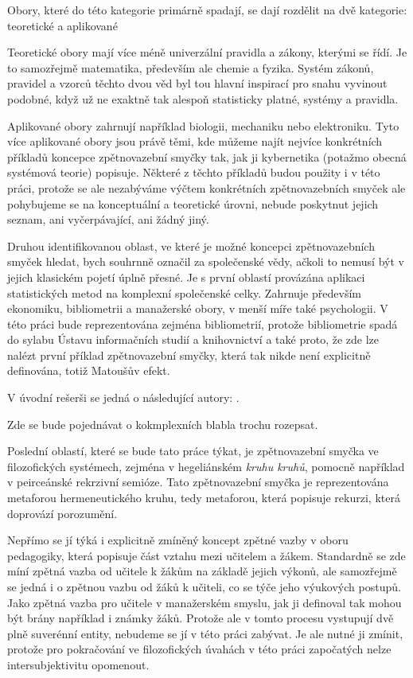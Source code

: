 \documentclass[11pt,a4paper]{article}
\begin{document}
Obory, které do této kategorie primárně spadají, se dají rozdělit na dvě kategorie: teoretické a aplikované

Teoretické obory mají více méně univerzální pravidla a zákony, kterými se řídí. Je to samozřejmě matematika, především ale chemie a fyzika. Systém zákonů, pravidel a vzorců těchto dvou věd byl tou hlavní inspirací pro snahu vyvinout podobné, když už ne exaktně tak alespoň statisticky platné, systémy a pravidla.

Aplikované obory zahrnují například biologii, mechaniku nebo elektroniku. Tyto více aplikované obory jsou právě těmi, kde můžeme najít nejvíce konkrétních příkladů koncepce zpětnovazební smyčky tak, jak ji kybernetika (potažmo obecná systémová teorie) popisuje. Některé z těchto příkladů budou použity i v této práci, protože se ale nezabýváme výčtem konkrétních zpětnovazebních smyček ale pohybujeme se na konceptuální a teoretické úrovni, nebude poskytnut jejich seznam, ani vyčerpávající, ani žádný jiný.

Druhou identifikovanou oblast, ve které je možné koncepci zpětnovazebních smyček hledat, bych souhrnně označil za společenské vědy, ačkoli to nemusí být v jejich klasickém pojetí úplně přesné. Je s první oblastí provázána aplikaci statistických metod na komplexní společenské celky. Zahrnuje především ekonomiku, bibliometrii a manažerské obory, v menší míře také psychologii. V této práci bude reprezentována zejména bibliometrií, protože bibliometrie spadá do sylabu Ústavu informačních studií a knihovnictví a také proto, že zde lze nalézt první příklad zpětnovazební smyčky, která tak nikde není explicitně definována, totiž Matoušův efekt. 

V úvodní rešerši se jedná o následující autory: \cite{ramaprasad_definition_1983, rigney_matthew_2010, soares_review_2011, skraba_group_2003, carver_self-regulation_1998, favari_megaproject_2020}.

Zde se bude pojednávat o kokmplexních blabla trochu rozepsat.

Poslední oblastí, které se bude tato práce týkat, je zpětnovazební smyčka ve filozofických systémech, zejména v hegeliánském \textit{kruhu kruhů}, pomocně například v peirceánské rekrzivní semióze. Tato zpětnovazební smyčka je reprezentována metaforou hermeneutického kruhu, tedy metaforou, která popisuje rekurzi, která doprovází porozumění. 

Nepřímo se jí týká i explicitně zmíněný koncept zpětné vazby v oboru pedagogiky, která popisuje část vztahu mezi učitelem a žákem. Standardně se zde míní zpětná vazba od učitele k žákům na základě jejich výkonů, ale samozřejmě se jedná i o zpětnou vazbu od žáků k učiteli, co se týče jeho výukových postupů. Jako zpětná vazba pro učitele v manažerském smyslu, jak ji definoval \cite{ramaprasad_definition_1983} tak mohou být brány například i známky žáků. Protože ale v tomto procesu vystupují dvě plně suverénní entity, nebudeme se jí v této práci zabývat. Je ale nutné ji zmínit, protože pro pokračování ve filozofických úvahách v této práci započatých nelze intersubjektivitu opomenout.
\end{document}
